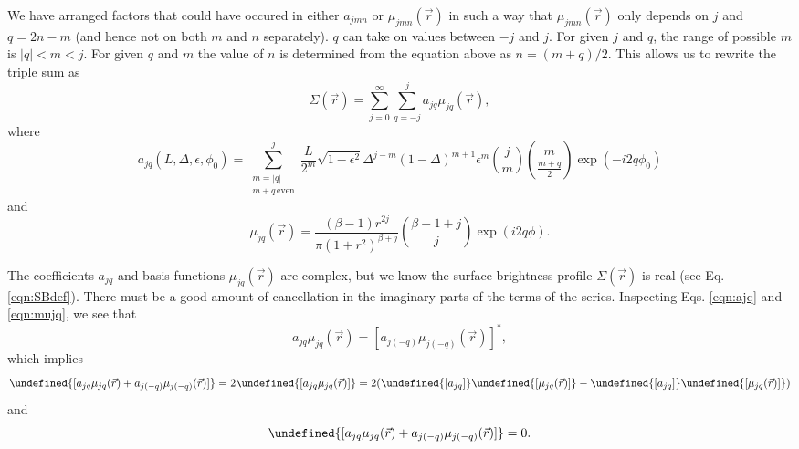 \documentclass{article}
\let\Re\undefined
\DeclareMathOperator{\Re}{Re}
\let\Im\undefined
\DeclareMathOperator{\Im}{Im}
\begin{document}
We have arranged factors that could have occured in either $a_{jmn}$ or $\mu_{jmn}(\vec{r})$ in such a way that $\mu_{jmn}(\vec{r})$ only depends on $j$ and $q = 2n-m$ (and hence not on both $m$ and $n$ separately).
$q$ can take on values between $-j$ and $j$.
For given $j$ and $q$, the range of possible $m$ is $|q| < m < j$.
For given $q$ and $m$ the value of $n$ is determined from the equation above as $n=(m+q)/2$.
This allows us to rewrite the triple sum as
\begin{equation}
  \label{eqn:sum_jq}
  \Sigma(\vec{r}) = \sum_{j=0}^{\infty}\sum_{q=-j}^{j} a_{jq}\mu_{jq}(\vec{r}),
\end{equation}
where
\begin{equation}
  \label{eqn:ajq}
  a_{jq}(L, \Delta, \epsilon, \phi_0) = \sum_{\substack{m=|q|\\m+q\,\mathrm{even}}}^{j}\frac{L}{2^m} \sqrt{1-\epsilon^2}\Delta^{j-m}(1-\Delta)^{m+1}\epsilon^m\binom{j}{m}\binom{m}{\frac{m+q}{2}}\exp(-i 2 q \phi_0)
\end{equation}
and
\begin{equation}
  \label{eqn:mujq}
  \mu_{jq}(\vec{r}) = \frac{(\beta-1)r^{2j}}{\pi(1+r^2)^{\beta+j}}\binom{\beta-1+j}{j}\exp(i 2 q \phi).
\end{equation}

The coefficients $a_{jq}$ and basis functions $\mu_{jq}(\vec{r})$ are complex, but we know the surface brightness profile $\Sigma(\vec{r})$ is real (see Eq. \ref{eqn:SBdef}).
There must be a good amount of cancellation in the imaginary parts of the terms of the series.
Inspecting Eqs. \ref{eqn:ajq} and \ref{eqn:mujq}, we see that
\begin{equation}
  a_{jq}\mu_{jq}(\vec{r}) = [a_{j(-q)}\mu_{j(-q)}(\vec{r})]^*,
\end{equation}
which implies
\begin{equation}
  \Re{[a_{jq}\mu_{jq}(\vec{r}) + a_{j(-q)}\mu_{j(-q)}(\vec{r})]} = 2\Re{[a_{jq}\mu_{jq}(\vec{r})]}
  = 2 (\Re{[a_{jq}]}\Re{[\mu_{jq}(\vec{r})]} - \Im{[a_{jq}]}\Im{[\mu_{jq}(\vec{r})]})
\end{equation}
and
\begin{equation}
  \Im{[a_{jq}\mu_{jq}(\vec{r}) + a_{j(-q)}\mu_{j(-q)}(\vec{r})]} = 0.
\end{equation}
\end{document}
